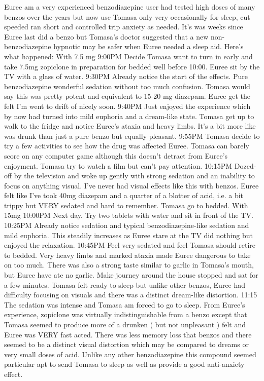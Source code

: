 \documentclass[12pt]{book}
\begin{document}
Euree am a very experienced benzodiazepine user had tested high doses of many benzos over the years but now use Tomasa only very occasionally for sleep, cut speeded ran short and controlled trip anxiety as needed. It's was weeks since Euree last did a benzo but Tomasa's doctor suggested that a new non-benzodiazepine hypnotic may be safer when Euree needed a sleep aid. Here's what happened: With 7.5 mg 9:00PM Decide Tomasa want to turn in early and take 7.5mg zopiclone in preparation for bedded well before 10:00. Euree sit by the TV with a glass of water. 9:30PM Already notice the start of the effects. Pure benzodiazepine wonderful sedation without too much confusion. Tomasa would say this was pretty potent and equivalent to 15-20 mg diazepam. Euree get the felt I'm went to drift of nicely soon. 9:40PM Just enjoyed the experience which by now had turned into mild euphoria and a dream-like state. Tomasa get up to walk to the fridge and notice Euree's ataxia and heavy limbs. It's a bit more like was drunk than just a pure benzo but equally pleasant. 9:55PM Tomasa decide to try a few activities to see how the drug was affected Euree. Tomasa can barely score on any computer game although this doesn't detract from Euree's enjoyment. Tomasa try to watch a film but can't pay attention. 10:15PM Dozed-off by the television and woke up gently with strong sedation and an inability to focus on anything visual. I've never had visual effects like this with benzos. Euree felt like I've took 40mg diazepam and a quarter of a blotter of acid, i.e. a bit trippy but VERY sedated and hard to remember. Tomasa go to bedded. With 15mg 10:00PM Next day. Try two tablets with water and sit in front of the TV. 10:25PM Already notice sedation and typical benzodiazepine-like sedation and mild euphoria. This steadily increases as Euree stare at the TV did nothing but enjoyed the relaxation. 10:45PM Feel very sedated and feel Tomasa should retire to bedded. Very heavy limbs and marked ataxia made Euree dangerous to take on too much. There was also a strong taste similar to garlic in Tomasa's mouth, but Euree have ate no garlic. Make journey around the house stopped and sat for a few minutes. Tomasa felt ready to sleep but unlike other benzos, Euree had difficulty focusing on visuals and there was a distinct dream-like distortion. 11:15 The sedation was intense and Tomasa am forced to go to sleep. From Euree's experience, zopiclone was virtually indistinguishable from a benzo except that Tomasa seemed to produce more of a drunken ( but not unpleasant ) felt and Euree was VERY fast acted. There was less memory loss that benzos and there seemed to be a distinct visual distortion which may be compared to dreams or very small doses of acid. Unlike any other benzodiazepine this compound seemed particular apt to send Tomasa to sleep as well as provide a good anti-anxiety effect.
\end{document}
